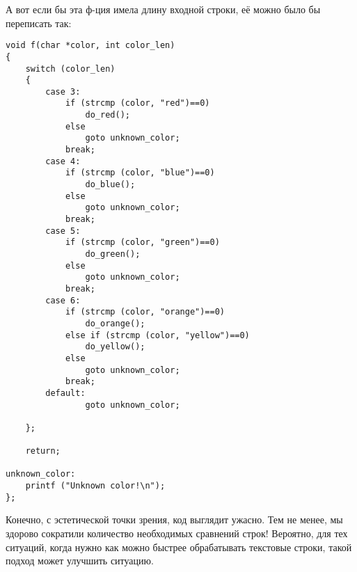 А вот если бы эта ф-ция имела длину входной строки, её можно было бы переписать так:

\begin{lstlisting}
void f(char *color, int color_len)
{
	switch (color_len)
	{
		case 3:
			if (strcmp (color, "red")==0)
				do_red();
			else 
				goto unknown_color;
			break;
		case 4:
			if (strcmp (color, "blue")==0)
				do_blue();
			else
				goto unknown_color;
			break;
		case 5:
			if (strcmp (color, "green")==0)
				do_green();
			else
				goto unknown_color;
			break;
		case 6:
			if (strcmp (color, "orange")==0)
				do_orange();
			else if (strcmp (color, "yellow")==0)
				do_yellow();
			else
				goto unknown_color;
			break;
		default:
				goto unknown_color;

	};

	return;

unknown_color:
	printf ("Unknown color!\n");
};
\end{lstlisting}

Конечно, с эстетической точки зрения, код выглядит ужасно.
Тем не менее, мы здорово сократили количество необходимых сравнений строк! Вероятно, для тех ситуаций, когда 
нужно как можно быстрее обрабатывать текстовые строки, такой подход может улучшить ситуацию.

